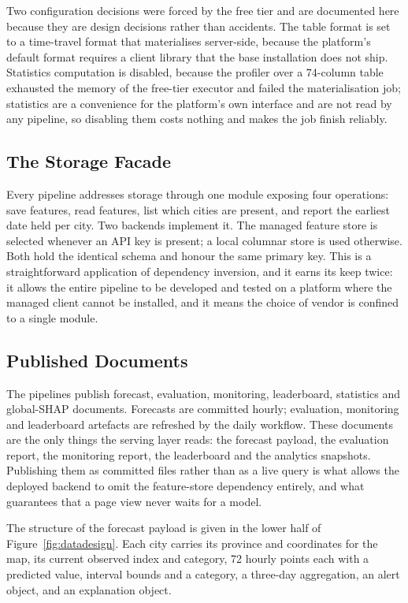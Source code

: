 Two configuration decisions were forced by the free tier and are documented here
because they are design decisions rather than accidents. The table format is set
to a time-travel format that materialises server-side, because the platform's
default format requires a client library that the base installation does not
ship. Statistics computation is disabled, because the profiler over a 74-column
table exhausted the memory of the free-tier executor and failed the
materialisation job; statistics are a convenience for the platform's own
interface and are not read by any pipeline, so disabling them costs nothing and
makes the job finish reliably.

\subsection{The Storage Facade}
Every pipeline addresses storage through one module exposing four operations:
save features, read features, list which cities are present, and report the
earliest date held per city. Two backends implement it. The managed feature store
is selected whenever an API key is present; a local columnar store is used
otherwise. Both hold the identical schema and honour the same primary key. This
is a straightforward application of dependency inversion, and it earns its keep
twice: it allows the entire pipeline to be developed and tested on a platform
where the managed client cannot be installed, and it means the choice of vendor
is confined to a single module.

\subsection{Published Documents}
The pipelines publish forecast, evaluation, monitoring, leaderboard, statistics
and global-SHAP documents. Forecasts are committed hourly; evaluation, monitoring
and leaderboard artefacts are refreshed by the daily workflow. These documents are
the only things the serving layer reads: the forecast payload, the evaluation
report, the monitoring report, the leaderboard and the analytics snapshots. Publishing them as
committed files rather than as a live query is what allows the deployed backend
to omit the feature-store dependency entirely, and what guarantees that a page
view never waits for a model.

The structure of the forecast payload is given in the lower half of
Figure~\ref{fig:datadesign}. Each city carries its province and coordinates for
the map, its current observed index and category, 72 hourly points each with a
predicted value, interval bounds and a category, a three-day aggregation, an
alert object, and an explanation object.

